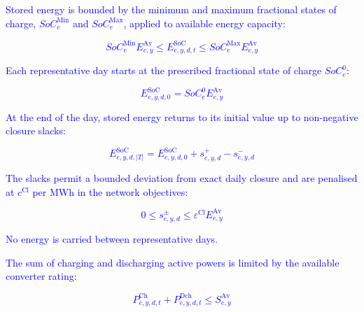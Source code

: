 \documentclass[preprint,12pt]{elsarticle}
\begin{document}
\textcolor{blue}{
    Stored energy is bounded by the minimum and maximum fractional states of charge, $SoC^{\text{Min}}_e$ and $SoC^{\text{Max}}_e$, applied to available energy capacity:
}

\textcolor{blue}{
    \begin{equation}
        SoC^{\text{Min}}_e E^{\text{Av}}_{e,y}
        \le E^{\text{SoC}}_{e,y,d,t}
        \le SoC^{\text{Max}}_e E^{\text{Av}}_{e,y}
        \label{eq:soc_limits}
    \end{equation}
}

\textcolor{blue}{
    Each representative day starts at the prescribed fractional state of charge $SoC^0_e$:
}

\textcolor{blue}{
    \begin{equation}
        E^{\text{SoC}}_{e,y,d,0}
        =
        SoC^0_e E^{\text{Av}}_{e,y}
        \label{eq:soc_initial}
    \end{equation}
}

\textcolor{blue}{
    At the end of the day, stored energy returns to its initial value up to non-negative closure slacks:
}

\textcolor{blue}{
    \begin{equation}
        E^{\text{SoC}}_{e,y,d,|T|}
        =
        E^{\text{SoC}}_{e,y,d,0}
        + s^+_{e,y,d} - s^-_{e,y,d}
        \label{eq:soc_closure}
    \end{equation}
}

\textcolor{blue}{
    The slacks permit a bounded deviation from exact daily closure and are penalised at $c^{\text{Cl}}$ per MWh in the network objectives:
}

\textcolor{blue}{
    \begin{equation}
        0 \le s^\pm_{e,y,d}
        \le \varepsilon^{\text{Cl}} E^{\text{Av}}_{e,y}
        \label{eq:soc_closure_slack}
    \end{equation}
}

\textcolor{blue}{
    No energy is carried between representative days.  
}

\textcolor{blue}{
    The sum of charging and discharging active powers is limited by the available converter rating:
}

\textcolor{blue}{
    \begin{equation}
        P^{\text{Ch}}_{e,y,d,t}
        + P^{\text{Dch}}_{e,y,d,t}
        \le S^{\text{Av}}_{e,y}
        \label{eq:storage_active_power_limit}
    \end{equation}
}
\end{document}
